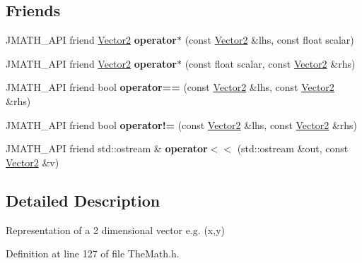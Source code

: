 \subsection*{Friends}
\begin{DoxyCompactItemize}
\item 
\hypertarget{class_vector2_a63837ede8cdb44fb6844ccaf4cee029e}{J\+M\+A\+T\+H\+\_\+\+A\+P\+I friend \hyperlink{class_vector2}{Vector2} {\bfseries operator$\ast$} (const \hyperlink{class_vector2}{Vector2} \&lhs, const float scalar)}\label{class_vector2_a63837ede8cdb44fb6844ccaf4cee029e}

\item 
\hypertarget{class_vector2_a65429d5d139aaefda1befd9b45551dac}{J\+M\+A\+T\+H\+\_\+\+A\+P\+I friend \hyperlink{class_vector2}{Vector2} {\bfseries operator$\ast$} (const float scalar, const \hyperlink{class_vector2}{Vector2} \&rhs)}\label{class_vector2_a65429d5d139aaefda1befd9b45551dac}

\item 
\hypertarget{class_vector2_a99a0ea8521ae9435b8cd58fb67c2a256}{J\+M\+A\+T\+H\+\_\+\+A\+P\+I friend bool {\bfseries operator==} (const \hyperlink{class_vector2}{Vector2} \&lhs, const \hyperlink{class_vector2}{Vector2} \&rhs)}\label{class_vector2_a99a0ea8521ae9435b8cd58fb67c2a256}

\item 
\hypertarget{class_vector2_ac4cfd2b8591ef4b5368b4cb60adced49}{J\+M\+A\+T\+H\+\_\+\+A\+P\+I friend bool {\bfseries operator!=} (const \hyperlink{class_vector2}{Vector2} \&lhs, const \hyperlink{class_vector2}{Vector2} \&rhs)}\label{class_vector2_ac4cfd2b8591ef4b5368b4cb60adced49}

\item 
\hypertarget{class_vector2_ad2be604639cd4afc35a14bd7e0990b03}{J\+M\+A\+T\+H\+\_\+\+A\+P\+I friend std\+::ostream \& {\bfseries operator$<$$<$} (std\+::ostream \&out, const \hyperlink{class_vector2}{Vector2} \&v)}\label{class_vector2_ad2be604639cd4afc35a14bd7e0990b03}

\end{DoxyCompactItemize}


\subsection{Detailed Description}
Representation of a 2 dimensional vector e.\+g. (x,y) 

Definition at line 127 of file The\+Math.\+h.



